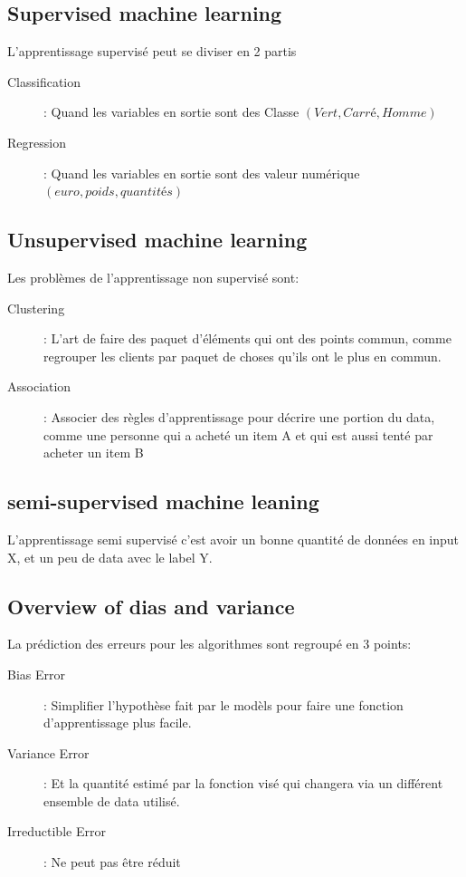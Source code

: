 \subsection{Supervised machine learning}
L'apprentissage supervisé peut se diviser en 2 partis
\begin{description}
\item[Classification]: Quand les variables en sortie sont des Classe $(Vert, Carré, Homme)$
\item[Regression]: Quand les variables en sortie sont des valeur numérique $(euro, poids, quantités)$
\end{description}

\subsection{Unsupervised machine learning}
Les problèmes de l'apprentissage non supervisé sont:
\begin{description}
\item[Clustering]: L'art de faire des paquet d'éléments qui ont des points commun, comme regrouper les clients par paquet de choses qu'ils ont le plus en commun.
\item[Association]: Associer des règles d'apprentissage pour décrire une portion du data, comme une personne qui a acheté un item A et qui est aussi tenté par acheter un item B
\end{description}

\subsection{semi-supervised machine leaning}
L'apprentissage semi supervisé c'est avoir un bonne quantité de données en input X, et un peu de data avec le label Y.

\subsection{Overview of dias and variance}
La prédiction des erreurs pour les algorithmes sont regroupé en 3 points:
\begin{description}
\item[Bias Error]:  Simplifier l'hypothèse fait par le modèls pour faire une fonction d'apprentissage plus facile.
\item[Variance Error]: Et la quantité estimé par la fonction visé qui changera via un différent ensemble de data utilisé.
\item[Irreductible Error]: Ne peut pas être réduit
\end{description}

